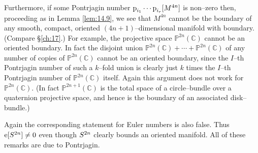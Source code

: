 \documentclass[../main]{subfiles}
\begin{document}
Furthermore, if some Pontrjagin number $\operatorname{p}_{i_1} \cdots \operatorname{p}_{i_r}[M^{4n}]$ is non--zero then, proceeding as in Lemma \ref{lem:14.9}, we see that $M^{4n}$ cannot be the boundary of any smooth, compact, oriented $(4n + 1)$--dimensional manifold with boundary. (Compare \S\ref{ch:17}.) For example, the projective space ${\mathbb P}^{2n}(\mathbb C)$ cannot be an oriented boundary. In fact the disjoint union ${\mathbb P}^{2n}(\mathbb C) + \cdots + {\mathbb P}^{2n}(\mathbb C)$ of any number of copies of ${\mathbb P}^{2n}(\mathbb C)$ cannot be an oriented boundary, since the $I$--th Pontrjagin number of such a $k$--fold union is clearly just $k$ times the $I$--th Pontrjagin number of ${\mathbb P}^{2n}(\mathbb C)$ itself. Again this argument does not work for ${\mathbb P}^{2n}(\mathbb C)$. (In fact ${\mathbb P}^{2n + 1}(\mathbb C)$ is the total space of a circle--bundle over a quaternion projective space, and hence is the boundary of an associated disk--bundle.)

Again the corresponding statement for Euler numbers is also false. Thus $\operatorname{e}[S^{2n}] \ne 0$ even though $S^{2n}$ clearly bounds an oriented manifold. All of these remarks are due to Pontrjagin. 
\end{document}
